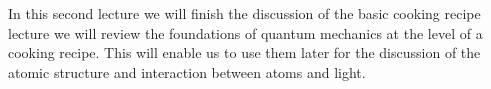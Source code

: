 In this second lecture we will finish the discussion of the basic cooking recipe lecture we will review the foundations of quantum mechanics at the level of a cooking recipe. This will enable us to use them later for the discussion of the atomic structure and interaction between atoms and light.